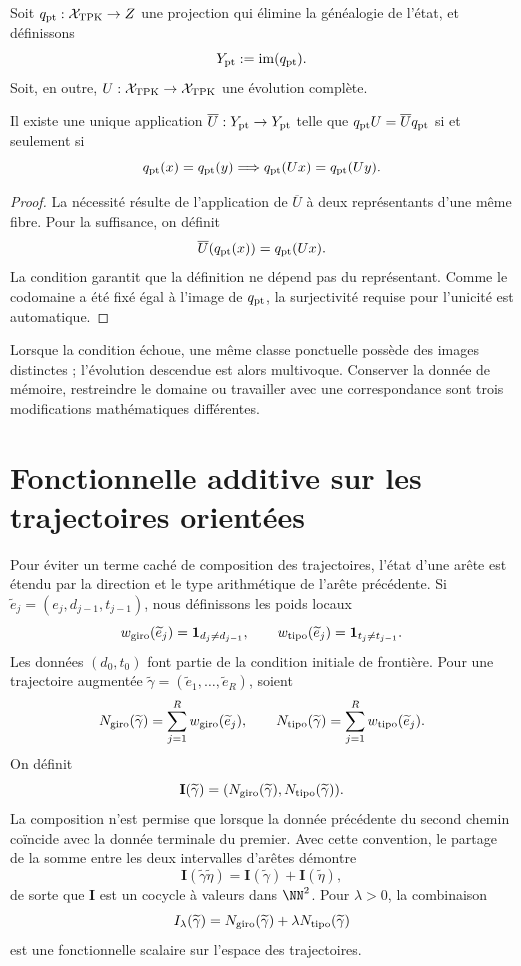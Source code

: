Soit \(q_{\rm pt}:\mathcal X_{\rm TPK}\to Z\) une projection qui élimine la
généalogie de l'état, et définissons
\[
 Y_{\rm pt}:=\operatorname{im}(q_{\rm pt}).
\]
Soit, en outre, \(U:\mathcal X_{\rm TPK}\to\mathcal X_{\rm TPK}\) une
évolution complète.

\begin{theorem}
Il existe une unique application
\(\overline U:Y_{\rm pt}\to Y_{\rm pt}\) telle que
\(q_{\rm pt}U=\overline Uq_{\rm pt}\) si et seulement si
\[
 q_{\rm pt}(x)=q_{\rm pt}(y)
 \Longrightarrow q_{\rm pt}(Ux)=q_{\rm pt}(Uy).
\]
\end{theorem}
\begin{proof}
La nécessité résulte de l'application de \(\overline U\) à deux représentants d'une
même fibre. Pour la suffisance, on définit
\[
 \overline U(q_{\rm pt}(x))=q_{\rm pt}(Ux).
\]
La condition garantit que la définition ne dépend pas du représentant. Comme
le codomaine a été fixé égal à l'image de \(q_{\rm pt}\), la
surjectivité requise pour l'unicité est automatique.
\end{proof}

Lorsque la condition échoue, une même classe ponctuelle possède des images distinctes ;
l'évolution descendue est alors multivoque. Conserver la donnée de
mémoire, restreindre le domaine ou travailler avec une correspondance sont trois
modifications mathématiques différentes.

\section{Fonctionnelle additive sur les trajectoires orientées}

Pour éviter un terme caché de composition des trajectoires, l'état d'une arête est
étendu par la direction et le type arithmétique de l'arête précédente. Si
\(\widetilde e_j=(e_j,d_{j-1},t_{j-1})\), nous définissons les poids locaux
\[
 w_{\rm giro}(\widetilde e_j)=\mathbf1_{d_j\ne d_{j-1}},
 \qquad
 w_{\rm tipo}(\widetilde e_j)=\mathbf1_{t_j\ne t_{j-1}}.
\]
Les données \((d_0,t_0)\) font partie de la condition initiale de frontière.
Pour une trajectoire augmentée
\(\widetilde\gamma=(\widetilde e_1,\ldots,\widetilde e_R)\), soient
\[
 N_{\rm giro}(\widetilde\gamma)=\sum_{j=1}^R
 w_{\rm giro}(\widetilde e_j),
 \qquad
 N_{\rm tipo}(\widetilde\gamma)=\sum_{j=1}^R
 w_{\rm tipo}(\widetilde e_j).
\]
On définit
\[
 \mathbf I(\widetilde\gamma)=
 (N_{\rm giro}(\widetilde\gamma),N_{\rm tipo}(\widetilde\gamma)).
\]
La composition n'est permise que lorsque la donnée précédente du second chemin
coïncide avec la donnée terminale du premier. Avec cette convention, le partage
de la somme entre les deux intervalles d'arêtes démontre
\[
 \mathbf I(\widetilde\gamma\widetilde\eta)
 =\mathbf I(\widetilde\gamma)+\mathbf I(\widetilde\eta),
\]
de sorte que \(\mathbf I\) est un cocycle à valeurs dans \(\NN^2\). Pour
\(\lambda>0\), la combinaison
\[
 I_\lambda(\widetilde\gamma)
 =N_{\rm giro}(\widetilde\gamma)
 +\lambda N_{\rm tipo}(\widetilde\gamma)
\]
est une fonctionnelle scalaire sur l'espace des trajectoires.

